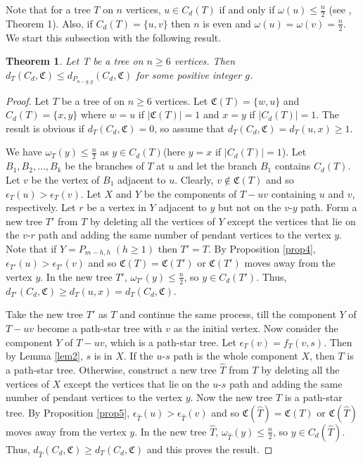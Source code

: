 \documentclass[11pt]{article}
\newtheorem{theorem}{Theorem}[section]
\begin{document}
Note that for a tree $T$ on $n$ vertices, $u\in C_d(T)$ if and only if $\omega(u)\leq \frac{n}{2}$ (see \cite{Ka}, Theorem 1). Also, if $C_d(T)=\{u,v\}$ then $n$ is even and $\omega(u)=\omega(v)=\frac{n}{2}$. We start this subsection with the following result.
\begin{theorem}\label{thm:cd1}
Let T be a tree on $n\geq 6$ vertices. Then  $d_T(C_d,\mathfrak{C})\leq d_{P_{n-g,g}}(C_d,\mathfrak{C})$ for some positive integer $g$.
\end{theorem}
\begin{proof}
Let $T$ be a tree of on $n\geq 6$ vertices. Let $\mathfrak{C}(T)=\{w,u\}$ and $C_d(T)=\{x,y\}$ where $w=u$ if $|\mathfrak{C}(T)|=1$ and $x=y$ if $|C_d(T)|=1$.  The result is obvious if $d_T(C_d,\mathfrak{C})=0$, so assume that  $d_T(C_d,\mathfrak{C})=d_T(u,x)\geq 1$.

We have $\omega_T(y)\leq \frac{n}{2}$ as $y\in C_d(T)$(here $y=x$ if $|C_d(T)|=1$). Let $B_1,B_2,\ldots,B_k$ be the branches of $T$ at $u$ and let the branch $B_1$ contains $C_d(T)$. Let $v$ be the vertex of $B_1$ adjacent to $u$. Clearly, $v\notin \mathfrak{C}(T)$ and so $\epsilon_T(u)>\epsilon_T(v)$. Let $X$ and $Y$ be the components of $T-uv$ containing $u$ and $v$, respectively. Let $r$ be a vertex in $Y$ adjacent to $y$ but not on the $v$-$y$ path. Form  a new tree $T'$ from $T$ by deleting all the vertices of $Y$ except the vertices that lie on the $v$-$r$ path and adding the same number of pendant vertices to the vertex $y$. Note that if $Y=P_{m-h,h}\;(h\geq 1)$ then $T'=T.$ By Proposition \ref{prop4}, $\epsilon_{T'}(u)>\epsilon_{T'}(v)$ and so $\mathfrak{C}(T)=\mathfrak{C}(T')$ or $\mathfrak{C}(T')$ moves away from the vertex $y$. In the new tree $T'$, $\omega_{T'}(y)\leq \frac{n}{2}$, so $y\in C_d(T')$. Thus,  $d_{T'}(C_d,\mathfrak{C})\geq d_T(u,x)=d_T(C_d,\mathfrak{C})$.

Take the new tree $T'$ as $T$ and continue the same process, till the component $Y$ of $T-uv$ become a path-star tree with $v$ as the initial vertex. Now consider the component $Y$ of $T-uv$, which is a path-star tree. Let  $\epsilon_{T}(v)=f_T(v,s)$. Then by Lemma \ref{lem2}, $s$ is in $X$. If  the $u$-$s$ path is the whole component $X$, then $T$ is a path-star tree. Otherwise, construct a new tree $\hat{T}$ from $T$ by deleting all the vertices of $X$ except the vertices that lie on the $u$-$s$ path and adding the same number of pendant vertices to the vertex $y$. Now the new tree $\hat{T}$ is a path-star tree. By Proposition \ref{prop5}, $\epsilon_{\hat{T}}(u)>\epsilon_{\hat{T}}(v)$ and so $\mathfrak{C}(\hat{T})=\mathfrak{C}(T)$ or $\mathfrak{C}(\hat{T})$ moves away from the vertex $y$. In the new tree $\hat{T}$, $\omega_{\hat{T}}(y)\leq \frac{n}{2}$, so $y\in C_d(\hat{T})$. Thus, $d_{\hat{T}}(C_d,\mathfrak{C})\geq d_T(C_d,\mathfrak{C})$ and this proves the result.
\end{proof}
\end{document}
